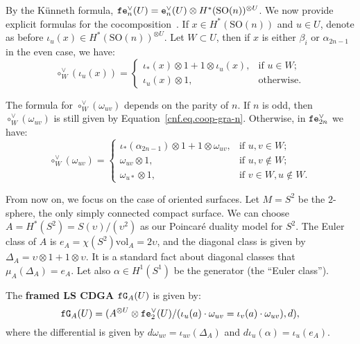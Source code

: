 By the Künneth formula, $\ff\enV(U) = \enV(U) \otimes H^{*}(\mathrm{SO}(n))^{\otimes U}$.
We now provide explicit formulas for the cocomposition~\cite{SalvatoreWahl2003}.
If $x \in H^{*}(\mathrm{SO}(n))$ and $u \in U$, denote as before $\iota_{u}(x) \in H^{*}(\mathrm{SO}(n))^{\otimes U}$.
Let $W \subset U$, then if $x$ is either $\beta_{i}$ or $\alpha_{2n-1}$ in the even case, we have:
\begin{equation}
  \label{cnf.eq.cocomp-alpha}
  \circ_{W}^{\vee}(\iota_{u}(x)) =
  \begin{cases}
    \iota_{*}(x) \otimes 1 + 1 \otimes \iota_{u}(x), & \text{if } u \in W; \\
    \iota_{u}(x) \otimes 1, & \text{otherwise.}
  \end{cases}
\end{equation}

The formula for $\circ_{W}^{\vee}(\omega_{uv})$ depends on the parity of $n$.
If $n$ is odd, then $\circ_{W}^{\vee}(\omega_{uv})$ is still given by Equation~\eqref{cnf.eq.coop-gra-n}.
Otherwise, in $\ff\enV[2n]$ we have:
\begin{equation}
  \label{cnf.eq.cocomp-w}
  \circ_{W}^{\vee}(\omega_{uv}) = \begin{cases}
    \iota_{*}(\alpha_{2n-1}) \otimes 1 + 1 \otimes \omega_{uv}, & \text{if } u,v \in W; \\
    \omega_{uv} \otimes 1, & \text{if } u,v \not\in W; \\
    \omega_{u*} \otimes 1, & \text{if } v \in W, u \not\in W.
  \end{cases}
\end{equation}

From now on, we focus on the case of oriented surfaces.
Let $M = S^{2}$ be the $2$-sphere, the only simply connected compact surface.
We can choose $A = H^{*}(S^{2}) = S(\upsilon)/(\upsilon^{2})$ as our Poincaré duality model for $S^{2}$.
The Euler class of $A$ is $e_{A} = \chi(S^{2}) \mathrm{vol}_{A} = 2 \upsilon$, and the diagonal class is given by $\Delta_{A} = \upsilon \otimes 1 + 1 \otimes \upsilon$.
It is a standard fact about diagonal classes that $\mu_{A}(\Delta_{A}) = e_{A}$.
Let also $\alpha \in H^{1}(S^{1})$ be the generator (the ``Euler class'').

\begin{definition}
  \label{cnf.def.framed-kls}
  The \textbf{framed LS CDGA} $\ff\GG{A}(U)$ is given by:
  \[ \ff\GG{A}(U) = (A^{\otimes U} \otimes \ff\enV[2](U) / (\iota_{u} (a) \cdot \omega_{uv} = \iota_{v}(a) \cdot \omega_{uv}), d), \]
  where the differential is given by $d\omega_{uv} = \iota_{uv}(\Delta_{A})$ and $d \iota_{u}(\alpha) = \iota_{u}(e_{A})$.
\end{definition}

